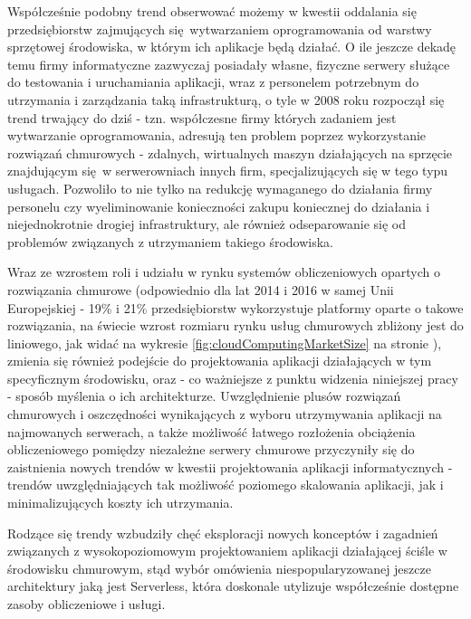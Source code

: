 \documentclass[oneside]{mgr}
\begin{document}
Współcześnie podobny trend obserwować możemy w kwestii oddalania się przedsiębiorstw zajmujących się wytwarzaniem oprogramowania od warstwy sprzętowej środowiska, w którym ich aplikacje będą działać. O ile jeszcze dekadę temu firmy informatyczne zazwyczaj posiadały własne, fizyczne serwery służące do testowania i uruchamiania aplikacji, wraz z personelem potrzebnym do utrzymania i zarządzania taką infrastrukturą, o tyle w 2008 roku rozpoczął się trend \cite{gartnerMovingToCloud} trwający do dziś - tzn. współczesne firmy których zadaniem jest wytwarzanie oprogramowania, adresują ten problem poprzez wykorzystanie rozwiązań chmurowych - zdalnych, wirtualnych maszyn działających na sprzęcie znajdującym się w serwerowniach innych firm, specjalizujących się w tego typu usługach. Pozwoliło to nie tylko na redukcję wymaganego do działania firmy personelu czy wyeliminowanie konieczności zakupu koniecznej do działania i niejednokrotnie drogiej infrastruktury, ale również odseparowanie się od problemów związanych z utrzymaniem takiego środowiska.

Wraz ze wzrostem roli i udziału w rynku systemów obliczeniowych opartych o rozwiązania chmurowe (odpowiednio dla lat 2014 i 2016 w samej Unii Europejskiej - 19\% i 21\% przedsiębiorstw wykorzystuje platformy oparte o takowe rozwiązania\cite{eurostatCloudComputingStats}, na świecie wzrost rozmiaru rynku usług chmurowych zbliżony jest do liniowego, jak widać na wykresie \ref{fig:cloudComputingMarketSize} na stronie \pageref{fig:cloudComputingMarketSize}), zmienia się również podejście do projektowania aplikacji działających w tym specyficznym środowisku, oraz - co ważniejsze z punktu widzenia niniejszej pracy - sposób myślenia o ich architekturze. Uwzględnienie plusów rozwiązań chmurowych i oszczędności wynikających z wyboru utrzymywania aplikacji na najmowanych serwerach, a także możliwość łatwego rozłożenia obciążenia obliczeniowego pomiędzy niezależne serwery chmurowe przyczyniły się do zaistnienia nowych trendów w kwestii projektowania aplikacji informatycznych - trendów uwzględniających tak możliwość poziomego skalowania aplikacji, jak i minimalizujących koszty ich utrzymania.

Rodzące się trendy wzbudziły chęć eksploracji nowych konceptów i zagadnień związanych z wysokopoziomowym projektowaniem aplikacji działającej ściśle w środowisku chmurowym, stąd wybór omówienia niespopularyzowanej jeszcze architektury jaką jest Serverless, która doskonale utylizuje współcześnie dostępne zasoby obliczeniowe i usługi.
\end{document}
